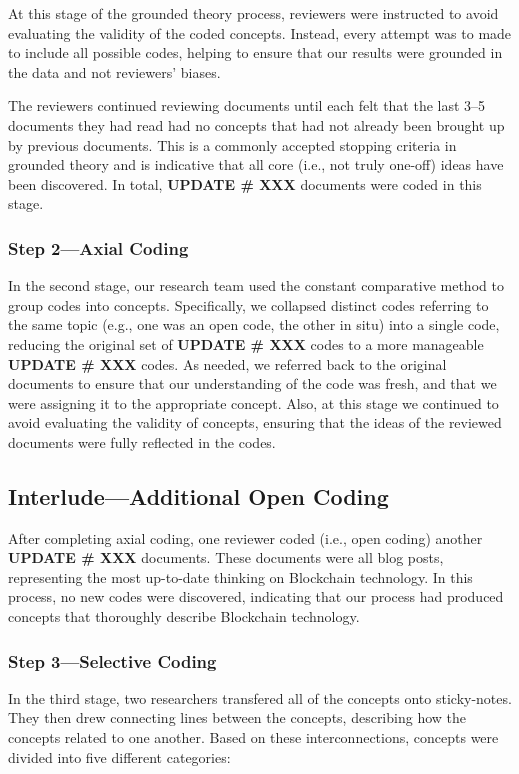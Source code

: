 At this stage of the grounded theory process, reviewers were instructed to avoid evaluating the validity of the coded concepts.
Instead, every attempt was to made to include all possible codes, helping to ensure that our results were grounded in the data and not reviewers' biases.

The reviewers continued reviewing documents until each felt that the last 3--5 documents they had read had no concepts that had not already been brought up by previous documents.
This is a commonly accepted stopping criteria in grounded theory and is indicative that all core (i.e., not truly one-off) ideas have been discovered.
In total, \textbf{UPDATE \# XXX} documents were coded in this stage.

\subsubsection{Step 2---Axial Coding}
In the second stage, our research team used the constant comparative method to group codes into concepts.
Specifically, we collapsed distinct codes referring to the same topic (e.g., one was an open code, the other in situ) into a single code, reducing the original set of \textbf{UPDATE \# XXX} codes to a more manageable \textbf{UPDATE \# XXX} codes.
As needed, we referred back to the original documents to ensure that our understanding of the code was fresh, and that we were assigning it to the appropriate concept.
Also, at this stage we continued to avoid evaluating the validity of concepts, ensuring that the ideas of the reviewed documents were fully reflected in the codes.

\subsection{Interlude---Additional Open Coding}
After completing axial coding, one reviewer coded (i.e., open coding) another \textbf{UPDATE \# XXX} documents.
These documents were all blog posts, representing the most up-to-date thinking on Blockchain technology.
In this process, no new codes were discovered, indicating that our process had produced concepts that thoroughly describe Blockchain technology.

\subsubsection{Step 3---Selective Coding}
In the third stage, two researchers transfered all of the concepts onto sticky-notes.
They then drew connecting lines between the concepts, describing how the concepts related to one another.
Based on these interconnections, concepts were divided into five different categories:

